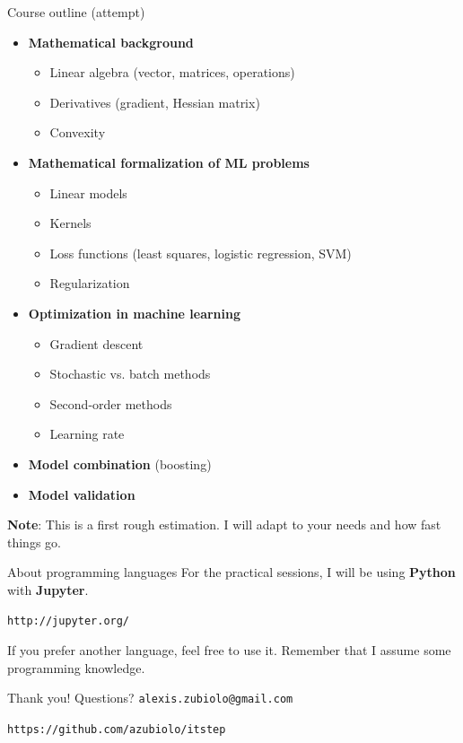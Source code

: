 \documentclass{beamer}
\begin{document}
\begin{frame}{Course outline (attempt)}
\vfill
\begin{itemize}
  \pause
  \item \textbf{Mathematical background}
  \begin{itemize}
  	\item Linear algebra (vector, matrices, operations)
  	\item Derivatives (gradient, Hessian matrix)
  	\item Convexity
  \end{itemize}
  \pause
  \item \textbf{Mathematical formalization of ML problems}
  \begin{itemize}
  	\item Linear models
  	\item Kernels
  	\item Loss functions (least squares, logistic regression, SVM)
  	\item Regularization
  \end{itemize}
  \pause
  \item \textbf{Optimization in machine learning}
  \begin{itemize}
  	\item Gradient descent
  	\item Stochastic vs. batch methods
  	\item Second-order methods
  	\item Learning rate
  \end{itemize}
  \pause
  \item \textbf{Model combination} (boosting)
  \pause
  \item \textbf{Model validation}
\end{itemize}
\vfill
\pause
\textbf{Note}: This is a first rough estimation. I will adapt to your needs and how fast things go.
\end{frame}

\begin{frame}{About programming languages}
For the practical sessions, I will be using \textbf{Python} with \textbf{Jupyter}.
\begin{center}
\texttt{http://jupyter.org/}
\end{center}
\vfill
If you prefer another language, feel free to use it. Remember that I assume some programming knowledge.
\end{frame}

\begin{frame}
\vfill
\centering
\begin{huge}
\huge{Thank you! Questions?}
\vfill
\texttt{alexis.zubiolo@gmail.com}
\end{huge}
\vfill
\begin{Large}
\texttt{https://github.com/azubiolo/itstep}
\end{Large}
\vfill
\end{frame}
\end{document}
